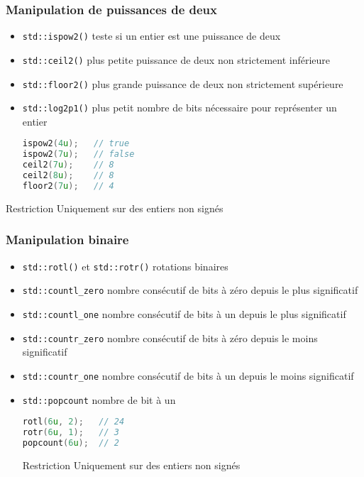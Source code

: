 \documentclass[C++.tex]{subfiles}
\begin{document}
\begin{frame}[fragile]
	\frametitle{Manipulation de puissances de deux}
	\begin{itemize}
		\item \lstinline|std::ispow2()| teste si un entier est une puissance de deux
		\item \lstinline|std::ceil2()| plus petite puissance de deux non strictement inférieure
		\item \lstinline|std::floor2()| plus grande puissance de deux non strictement supérieure
		\item \lstinline|std::log2p1()| plus petit nombre de bits nécessaire pour représenter un entier

		\begin{lstlisting}[language=C++]
ispow2(4u);   // true
ispow2(7u);   // false
ceil2(7u);    // 8
ceil2(8u);    // 8
floor2(7u);   // 4\end{lstlisting}
	\end{itemize}

	\begin{alertblock}{Restriction}
		Uniquement sur des entiers non signés
	\end{alertblock}
\end{frame}

\begin{frame}[fragile]
	\frametitle{Manipulation binaire}
	\begin{itemize}
		\item \lstinline|std::rotl()| et \lstinline|std::rotr()| rotations binaires


		\item \lstinline|std::countl_zero| nombre consécutif de bits à zéro depuis le plus significatif
		\item \lstinline|std::countl_one| nombre consécutif de bits à un depuis le plus significatif
		\item \lstinline|std::countr_zero| nombre consécutif de bits à zéro depuis le moins significatif
		\item \lstinline|std::countr_one| nombre consécutif de bits à un depuis le moins significatif
		\item \lstinline|std::popcount| nombre de bit à un

		\begin{lstlisting}[language=C++]
rotl(6u, 2);   // 24
rotr(6u, 1);   // 3
popcount(6u);  // 2\end{lstlisting}

		\begin{alertblock}{Restriction}
			Uniquement sur des entiers non signés
		\end{alertblock}
	\end{itemize}
\end{frame}
\end{document}
